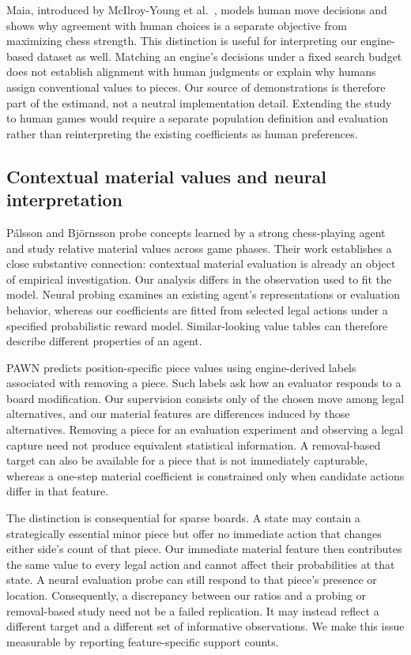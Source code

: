 \documentclass{jcst}
\begin{document}
Maia, introduced by McIlroy-Young et al.\ \cite{maia}, models human move decisions and shows why agreement with human choices is a separate objective from maximizing chess strength. This distinction is useful for interpreting our engine-based dataset as well. Matching an engine's decisions under a fixed search budget does not establish alignment with human judgments or explain why humans assign conventional values to pieces. Our source of demonstrations is therefore part of the estimand, not a neutral implementation detail. Extending the study to human games would require a separate population definition and evaluation rather than reinterpreting the existing coefficients as human preferences.

\subsection{Contextual material values and neural interpretation}
P\'alsson and Bj\"ornsson \cite{palsson} probe concepts learned by a strong chess-playing agent and study relative material values across game phases. Their work establishes a close substantive connection: contextual material evaluation is already an object of empirical investigation. Our analysis differs in the observation used to fit the model. Neural probing examines an existing agent's representations or evaluation behavior, whereas our coefficients are fitted from selected legal actions under a specified probabilistic reward model. Similar-looking value tables can therefore describe different properties of an agent.

PAWN \cite{pawn} predicts position-specific piece values using engine-derived labels associated with removing a piece. Such labels ask how an evaluator responds to a board modification. Our supervision consists only of the chosen move among legal alternatives, and our material features are differences induced by those alternatives. Removing a piece for an evaluation experiment and observing a legal capture need not produce equivalent statistical information. A removal-based target can also be available for a piece that is not immediately capturable, whereas a one-step material coefficient is constrained only when candidate actions differ in that feature.

The distinction is consequential for sparse boards. A state may contain a strategically essential minor piece but offer no immediate action that changes either side's count of that piece. Our immediate material feature then contributes the same value to every legal action and cannot affect their probabilities at that state. A neural evaluation probe can still respond to that piece's presence or location. Consequently, a discrepancy between our ratios and a probing or removal-based study need not be a failed replication. It may instead reflect a different target and a different set of informative observations. We make this issue measurable by reporting feature-specific support counts.
\end{document}
